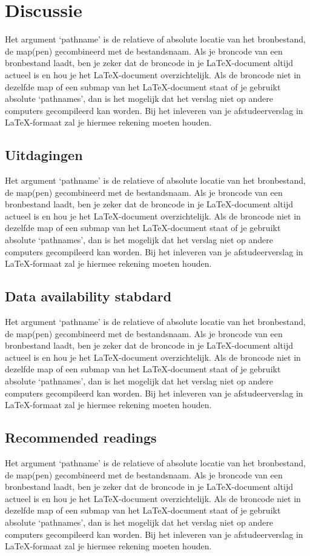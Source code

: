 \section{Discussie}
Het argument `pathname' is de relatieve of absolute locatie van het
bronbestand, de map(pen) gecombineerd met de bestandsnaam. Als je
broncode van een bronbestand laadt, ben je zeker dat de broncode in je
\LaTeX{}-document altijd actueel is en hou je het \LaTeX{}-document
overzichtelijk. Als de broncode niet in dezelfde map of een submap van
het \LaTeX{}-document staat of je gebruikt absolute `pathnames', dan
is het mogelijk dat het verslag niet op andere computers gecompileerd
kan worden. Bij het inleveren van je afstudeerverslag in
\LaTeX{}-formaat zal je hiermee rekening moeten houden.
\subsection{Uitdagingen}

Het argument `pathname' is de relatieve of absolute locatie van het
bronbestand, de map(pen) gecombineerd met de bestandsnaam. Als je
broncode van een bronbestand laadt, ben je zeker dat de broncode in je
\LaTeX{}-document altijd actueel is en hou je het \LaTeX{}-document
overzichtelijk. Als de broncode niet in dezelfde map of een submap van
het \LaTeX{}-document staat of je gebruikt absolute `pathnames', dan
is het mogelijk dat het verslag niet op andere computers gecompileerd
kan worden. Bij het inleveren van je afstudeerverslag in
\LaTeX{}-formaat zal je hiermee rekening moeten houden.
\subsection{Data availability stabdard}
Het argument `pathname' is de relatieve of absolute locatie van het
bronbestand, de map(pen) gecombineerd met de bestandsnaam. Als je
broncode van een bronbestand laadt, ben je zeker dat de broncode in je
\LaTeX{}-document altijd actueel is en hou je het \LaTeX{}-document
overzichtelijk. Als de broncode niet in dezelfde map of een submap van
het \LaTeX{}-document staat of je gebruikt absolute `pathnames', dan
is het mogelijk dat het verslag niet op andere computers gecompileerd
kan worden. Bij het inleveren van je afstudeerverslag in
\LaTeX{}-formaat zal je hiermee rekening moeten houden.

\subsection{Recommended readings}
Het argument `pathname' is de relatieve of absolute locatie van het
bronbestand, de map(pen) gecombineerd met de bestandsnaam. Als je
broncode van een bronbestand laadt, ben je zeker dat de broncode in je
\LaTeX{}-document altijd actueel is en hou je het \LaTeX{}-document
overzichtelijk. Als de broncode niet in dezelfde map of een submap van
het \LaTeX{}-document staat of je gebruikt absolute `pathnames', dan
is het mogelijk dat het verslag niet op andere computers gecompileerd
kan worden. Bij het inleveren van je afstudeerverslag in
\LaTeX{}-formaat zal je hiermee rekening moeten houden.



